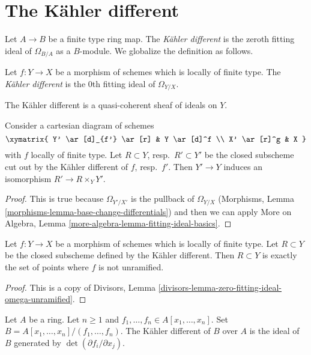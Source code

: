 \section{The K\"ahler different}
\label{section-kahler-different}

\noindent
Let $A \to B$ be a finite type ring map. The {\it K\"ahler different} is the
zeroth fitting ideal of $\Omega_{B/A}$ as a $B$-module. We globalize the
definition as follows.

\begin{definition}
\label{definition-kahler-different}
Let $f : Y \to X$ be a morphism of schemes which is locally of finite type.
The {\it K\"ahler different} is the $0$th fitting ideal of $\Omega_{Y/X}$.
\end{definition}

\noindent
The K\"ahler different is a quasi-coherent sheaf of ideals on $Y$.

\begin{lemma}
\label{lemma-base-change-kahler-different}
Consider a cartesian diagram of schemes
$$
\xymatrix{
Y' \ar[d]_{f'} \ar[r] & Y \ar[d]^f \\
X' \ar[r]^g & X
}
$$
with $f$ locally of finite type. Let $R \subset Y$, resp.\ $R' \subset Y'$
be the closed subscheme cut out by the K\"ahler different of $f$, resp.\ $f'$.
Then $Y' \to Y$ induces an isomorphism $R' \to R \times_Y Y'$.
\end{lemma}

\begin{proof}
This is true because $\Omega_{Y'/X'}$ is the pullback of $\Omega_{Y/X}$
(Morphisms, Lemma \ref{morphisms-lemma-base-change-differentials})
and then we can apply
More on Algebra, Lemma \ref{more-algebra-lemma-fitting-ideal-basics}.
\end{proof}

\begin{lemma}
\label{lemma-kahler-different}
Let $f : Y \to X$ be a morphism of schemes which is locally of finite type.
Let $R \subset Y$ be the closed subscheme defined by
the K\"ahler different. Then $R \subset Y$ is exactly
the set of points where $f$ is not unramified.
\end{lemma}

\begin{proof}
This is a copy of
Divisors, Lemma \ref{divisors-lemma-zero-fitting-ideal-omega-unramified}.
\end{proof}

\begin{lemma}
\label{lemma-kahler-different-complete-intersection}
Let $A$ be a ring. Let $n \geq 1$ and
$f_1, \ldots, f_n \in A[x_1, \ldots, x_n]$.
Set $B = A[x_1, \ldots, x_n]/(f_1, \ldots, f_n)$.
The K\"ahler different of $B$ over $A$ is the ideal
of $B$ generated by $\det(\partial f_i/\partial x_j)$.
\end{lemma}

